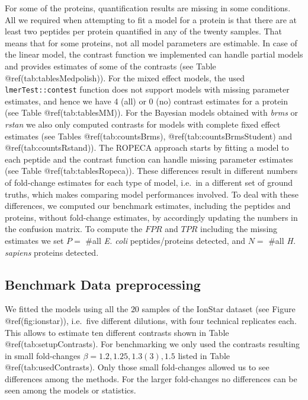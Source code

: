 \documentclass[journal=jacsat,manuscript=article]{achemso}
\begin{document}
For some of the proteins, quantification results are missing in some
conditions. All we required when attempting to fit a model for a protein
is that there are at least two peptides per protein quantified in any of
the twenty samples. That means that for some proteins, not all model
parameters are estimable. In case of the linear model, the contrast
function we implemented can handle partial models and provides estimates
of some of the contrasts (see Table @ref(tab:tablesMedpolish)). For the
mixed effect models, the used \texttt{lmerTest::contest} function does
not support models with missing parameter estimates, and hence we have 4
(all) or 0 (no) contrast estimates for a protein (see Table
@ref(tab:tablesMM)). For the Bayesian models obtained with \emph{brms}
or \emph{rstan} we also only computed contrasts for models with complete
fixed effect estimates (see Tables @ref(tab:countsBrms),
@ref(tab:countsBrmsStudent) and @ref(tab:countsRstand)). The ROPECA
approach starts by fitting a model to each peptide and the contrast
function can handle missing parameter estimates (see Table
@ref(tab:tablesRopeca)). These differences result in different numbers
of fold-change estimates for each type of model, i.e.~in a different set
of ground truths, which makes comparing model performances involved. To
deal with these differences, we computed our benchmark estimates,
including the peptides and proteins, without fold-change estimates, by
accordingly updating the numbers in the confusion matrix. To compute the
\(FPR\) and \(TPR\) including the missing estimates we set \(P =\) \#all
\emph{E. coli} peptides/proteins detected, and \(N =\) \#all \emph{H.
sapiens} proteins detected.

\hypertarget{benchmark-data-preprocessing}{%
\subsection{Benchmark Data
preprocessing}\label{benchmark-data-preprocessing}}

We fitted the models using all the \(20\) samples of the IonStar dataset
(see Figure @ref(fig:ionstar)), i.e.~five different dilutions, with four
technical replicates each. This allows to estimate ten different
contrasts shown in Table @ref(tab:setupContrasts). For benchmarking we
only used the contrasts resulting in small fold-changes
\(\beta = 1.2,1.25,1.3(3),1.5\) listed in Table @ref(tab:usedContrasts).
Only those small fold-changes allowed us to see differences among the
methods. For the larger fold-changes no differences can be seen among
the models or statistics.
\end{document}
